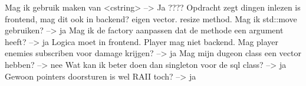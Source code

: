 Mag ik gebruik maken van <cstring> --> Ja
???? Opdracht zegt dingen inlezen is frontend, mag dit ook in backend?
eigen vector. resize method. Mag ik std::move gebruiken? --> ja
Mag ik de factory aanpassen dat de methode een argument heeft? --> ja
Logica moet in frontend. Player mag niet backend. Mag player enemies subscriben voor damage krijgen? --> ja
Mag mijn dugeon class een vector hebben? --> nee
Wat kan ik beter doen dan singleton voor de sql class? --> ja
Gewoon pointers doorsturen is wel RAII toch? --> ja